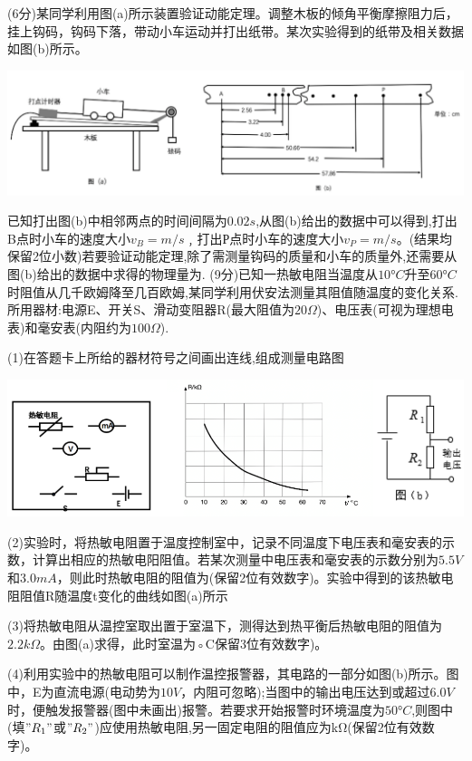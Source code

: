 
\question[6] (6分)某同学利用图(a)所示装置验证动能定理。调整木板的倾角平衡摩擦阻力后，挂上钩码，钩码下落，带动小车运动并打出纸带。某次实验得到的纸带及相关数据如图(b)所示。\begin{center}\includegraphics[width=14cm]{img/image7.png}\end{center}已知打出图(b)中相邻两点的时间间隔为$0.02s$,从图(b)给出的数据中可以得到,打出B点时小车的速度大小$v_B=$$m/s﹐$打出Р点时小车的速度大小$v_P=$$m/s$。(结果均保留2位小数)若要验证动能定理,除了需测量钩码的质量和小车的质量外,还需要从图(b)给出的数据中求得的物理量为.
\question[6] (9分)已知一热敏电阻当温度从$10°C$升至$60°C$时阻值从几千欧姆降至几百欧姆,某同学利用伏安法测量其阻值随温度的变化关系.所用器材:电源E、开关S、滑动变阻器R(最大阻值为$20Ω$)、电压表(可视为理想电表)和毫安表(内阻约为$100Ω$).

(1)在答题卡上所给的器材符号之间画出连线,组成测量电路图\begin{center}\includegraphics[width=14cm]{img/image8.png}\end{center}

(2)实验时，将热敏电阻置于温度控制室中，记录不同温度下电压表和毫安表的示数，计算出相应的热敏电阳阻值。若某次测量中电压表和毫安表的示数分别为$5.5V$和$3.0mA$，则此时热敏电阻的阻值为(保留2位有效数字)。实验中得到的该热敏电阻阻值R随温度t变化的曲线如图(a)所示

(3)将热敏电阻从温控室取出置于室温下，测得达到热平衡后热敏电阻的阻值为$2.2kΩ$。由图(a)求得，此时室温为◦C保留3位有效数字)。

(4)利用实验中的热敏电阻可以制作温控报警器，其电路的一部分如图(b)所示。图中，E为直流电源(电动势为$10V$，内阻可忽略);当图中的输出电压达到或超过$6.0V$时，便触发报警器(图中未画出)报警。若要求开始报警时环境温度为$50°C$,则图中(填$"R_1"$或$"R_2"$)应使用热敏电阻,另一固定电阻的阻值应为kΩ(保留2位有效数字)。


